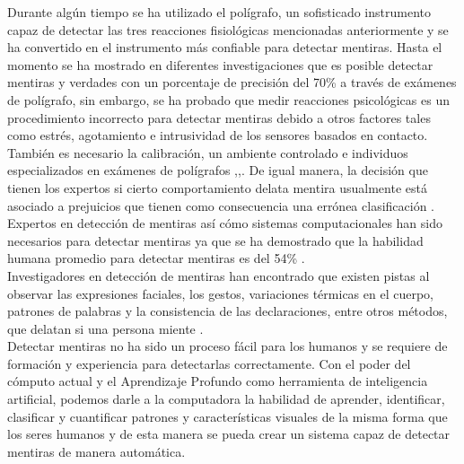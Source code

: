 \begin{onehalfspacing}
Durante algún tiempo se ha utilizado el polígrafo, un sofisticado instrumento capaz de detectar las tres reacciones fisiológicas mencionadas anteriormente y se ha convertido en el instrumento más confiable para detectar mentiras. Hasta el momento se ha mostrado en diferentes investigaciones que es posible detectar mentiras y verdades con un porcentaje de precisión del 70\% a través de exámenes de polígrafo, sin embargo, se ha probado que medir reacciones psicológicas es un procedimiento incorrecto para detectar mentiras debido a otros factores tales como estrés, agotamiento e intrusividad de los sensores basados en contacto. También es necesario la calibración, un ambiente controlado e individuos especializados en exámenes de polígrafos \cite{Perez-rosasDeceptionData},\cite{Perez-Rosas2015VerbalDetection},\cite{Perez-rosas2000DetectingBehavior}. De igual manera, la decisión que tienen los expertos si cierto comportamiento delata mentira usualmente está asociado a prejuicios que tienen como consecuencia una errónea clasificación \cite{Bhaskaran2011LieLearning}.\\

Expertos en detección de mentiras así cómo sistemas computacionales han sido necesarios para detectar mentiras ya que se ha demostrado que la habilidad humana promedio para detectar mentiras es del 54\% \cite{Bond2006AccuracyJudgments}.\\

Investigadores en detección de mentiras han encontrado que existen pistas al observar las expresiones faciales, los gestos, variaciones térmicas en el cuerpo, patrones de palabras y la consistencia de las declaraciones, entre otros métodos, que delatan si una persona miente \cite{Bhaskaran2011LieLearning}.\\

Detectar mentiras no ha sido un proceso fácil para los humanos y se requiere de formación y experiencia para detectarlas correctamente. Con el poder del cómputo actual y el Aprendizaje Profundo como herramienta de inteligencia artificial,  podemos darle a la computadora la habilidad de aprender, identificar, clasificar y cuantificar patrones y características visuales de la misma forma que los seres humanos y de esta manera se pueda crear un sistema capaz de detectar mentiras de manera automática.\\

%


\end{onehalfspacing}
